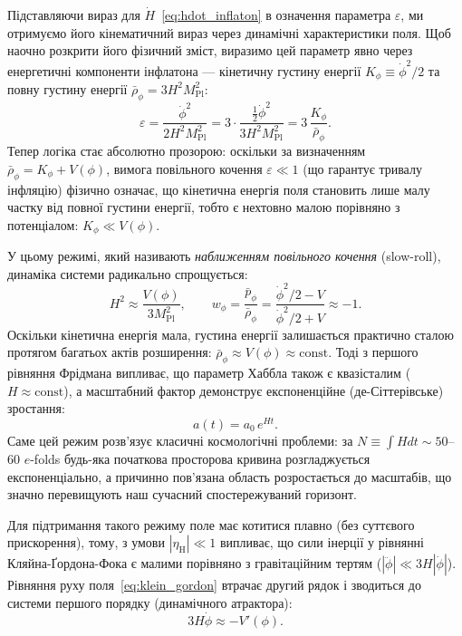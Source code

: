 \documentclass[12pt, a4paper]{article}
\begin{document}
Підставляючи вираз для $\dot{H}$~\eqref{eq:hdot_inflaton} в означення параметра $\varepsilon$, ми отримуємо його кінематичний вираз через динамічні характеристики поля. Щоб наочно розкрити його фізичний зміст, виразимо цей параметр явно через енергетичні компоненти інфлатона --- кінетичну густину енергії $K_\phi \equiv \dot{\phi}^2/2$ та повну густину енергії $\bar{\rho}_\phi = 3H^2 M_\mathrm{Pl}^2$:
\begin{equation}\label{eq:epsilon_energy_ratio}
  \varepsilon = \frac{\dot\phi^2}{2H^2 M_\mathrm{Pl}^2} = 3 \cdot \frac{\tfrac{1}{2}\dot{\phi}^2}{3H^2 M_\mathrm{Pl}^2} = 3 \, \frac{K_\phi}{\bar{\rho}_\phi}.
\end{equation}
Тепер логіка стає абсолютно прозорою: оскільки за визначенням $\bar{\rho}_\phi = K_\phi + V(\phi)$, вимога повільного кочення $\varepsilon \ll 1$ (що гарантує тривалу інфляцію) фізично означає, що кінетична енергія поля становить лише малу частку від повної густини енергії, тобто є нехтовно малою порівняно з потенціалом: $K_\phi \ll V(\phi)$.

У цьому режимі, який називають \emph{наближенням повільного кочення} (slow-roll), динаміка системи радикально спрощується:
\begin{equation}\label{eq:sr_approximations}
  H^2 \approx \frac{V(\phi)}{3M_\mathrm{Pl}^2}, \qquad
  w_\phi = \frac{\bar{p}_\phi}{\bar{\rho}_\phi} = \frac{\dot\phi^2/2 - V}{\dot\phi^2/2 + V} \approx -1.
\end{equation}
Оскільки кінетична енергія мала, густина енергії залишається практично сталою протягом багатьох актів розширення: $\bar{\rho}_\phi \approx V(\phi) \approx \mathrm{const}$. Тоді з першого рівняння Фрідмана випливає, що параметр Хаббла також є квазісталим ($H \approx \mathrm{const}$), а масштабний фактор демонструє експоненційне (де-Сіттерівське) зростання:
\begin{equation}\label{eq:a_exponential}
  a(t) = a_0\,e^{Ht}.
\end{equation}
Саме цей режим розв'язує класичні космологічні проблеми: за $N \equiv \int H dt \sim 50$--$60$ $e$-folds будь-яка початкова просторова кривина розгладжується експоненціально, а причинно пов'язана область розростається до масштабів, що значно перевищують наш сучасний спостережуваний горизонт.

Для підтримання такого режиму поле має котитися плавно (без суттєвого прискорення), тому, з умови $|\eta_\mathrm{H}| \ll 1$ випливає, що сили інерції у рівнянні Кляйна-Ґордона-Фока є малими порівняно з гравітаційним тертям ($|\ddot\phi| \ll 3H|\dot\phi|$). Рівняння руху поля~\eqref{eq:klein_gordon} втрачає другий рядок і зводиться до системи першого порядку (динамічного атрактора):
\begin{equation}\label{eq:sr_attractor}
  3H\dot{\phi} \approx -V'(\phi).
\end{equation}
\end{document}

